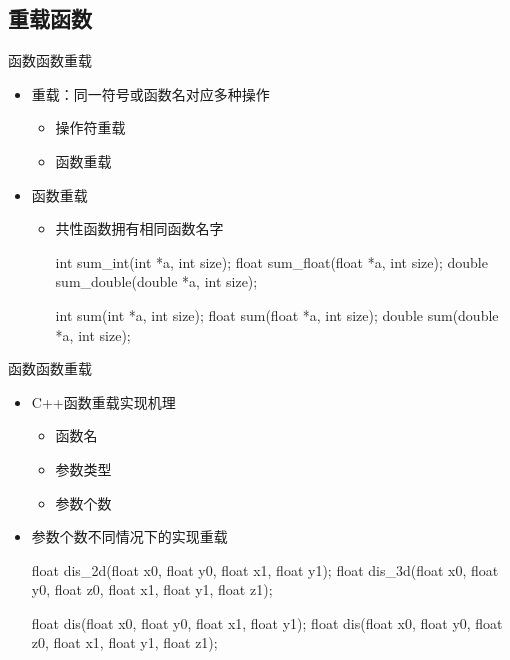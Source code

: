 \subsection[重载函数]{重载函数}
\begin{frame}[fragile]{函数}{函数重载}
  \stretchon
  \begin{itemize}
  \item 重载：同一符号或函数名对应多种操作
    \begin{itemize}
    \item 操作符重载
    \item 函数重载
    \end{itemize}
  \item 函数重载
    \begin{itemize}
    \item 共性函数拥有相同函数名字\\
      \begin{cppcode}
int sum_int(int *a, int size);
float sum_float(float *a, int size);
double sum_double(double *a, int size);
      \end{cppcode}
      \vspace{-2ex}
      \begin{cppcode}
int sum(int *a, int size);
float sum(float *a, int size);
double sum(double *a, int size);
      \end{cppcode}
    \end{itemize}
  \end{itemize}
  \stretchoff
\end{frame}

\begin{frame}[fragile]{函数}{函数重载}
  \stretchon
  \begin{itemize}
  \item C++函数重载实现机理
    \begin{itemize}
    \item 函数名
    \item 参数类型
    \item 参数个数
    \end{itemize}
  \item 参数个数不同情况下的实现重载
    \begin{itemize}
      \begin{cppcode}
float dis_2d(float x0, float y0, float x1, float y1);
float dis_3d(float x0, float y0, float z0,
             float x1, float y1, float z1);
      \end{cppcode}
      \vspace{-2ex}
      \begin{cppcode}
float dis(float x0, float y0, float x1, float y1);
float dis(float x0, float y0, float z0,
          float x1, float y1, float z1);
      \end{cppcode}
    \end{itemize}
  \end{itemize}
  \stretchoff
\end{frame}

